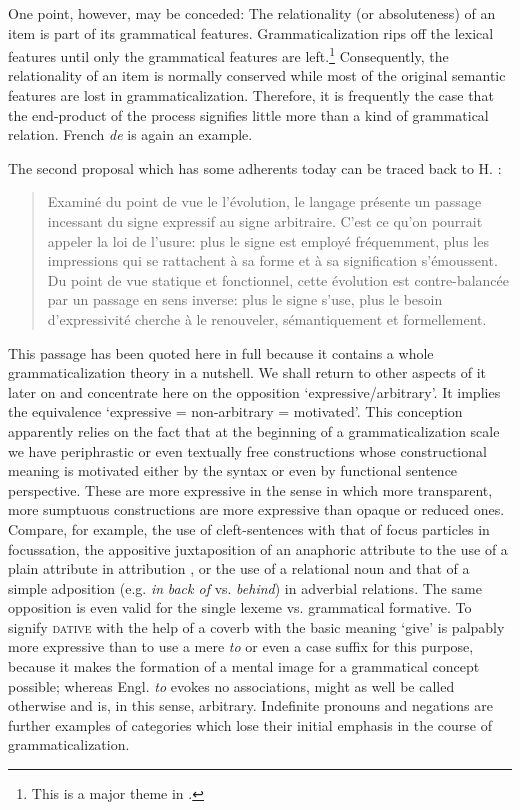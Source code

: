 One point, however, may be conceded: The relationality (or absoluteness) of an item is part of its grammatical features. Grammaticalization rips off the lexical features until only the grammatical features are left.\footnote{This is a major theme in \citet{Givón1973}.} Consequently, the relationality of an item is normally conserved while most of the original semantic features are lost in grammaticalization. Therefore, it is frequently the case that the end-product of the process signifies little more than a kind of grammatical relation. French \textit{de} is again an example.

The second proposal which has some adherents today can be traced back to H. \citet[233]{Frei1929}:

\begin{quote}
Examiné du point de vue le l'évolution, le langage présente un passage incessant du signe expressif au signe arbitraire. C'est ce qu'on pourrait appeler la loi de l'usure: plus le signe est employé fréquemment, plus les impressions qui se rattachent à sa forme et à sa signification s'émoussent. Du point de vue statique et fonctionnel, cette évolution est contre-balancée par un passage en sens inverse: plus le signe s'use, plus le besoin d'expressivité cherche à le renouveler, sémantiquement et formellement.
\end{quote}

\noindent This passage has been quoted here in full because it contains a whole grammaticalization theory in a nutshell. We shall return to other aspects of it later on and concentrate here on the opposition ‘expressive/arbitrary’. It implies the equivalence ‘expressive = non-arbitrary = motivated’. This conception apparently relies on the fact that at the beginning of a grammaticalization scale we have periphrastic or even textually free constructions whose constructional meaning is motivated either by the syntax or even by functional sentence perspective. These are more expressive in the sense in which more transparent, more sumptuous constructions are more expressive than opaque or reduced ones. Compare, for example, the use of cleft-sentences with that of focus particles in focussation, the appositive juxtaposition of an anaphoric attribute to the use of a plain attribute in attribution%
, or the use of a relational noun and that of a simple adposition (e.g. \textit{in} \textit{back of} vs. \textit{behind}) in adverbial relations. The same opposition is even valid for the single lexeme vs. grammatical formative. To signify \textsc{dative} with the help of a coverb with the basic meaning ‘give’ is palpably more expressive than to use a mere \textit{to} or even a case suffix for this purpose, because it makes the formation of a mental image for a grammatical concept possible; whereas Engl. \textit{to} evokes no associations, might as well be called otherwise and is, in this sense, arbitrary. Indefinite pronouns and negations are further examples of categories which lose their initial emphasis in the course of grammaticalization.

